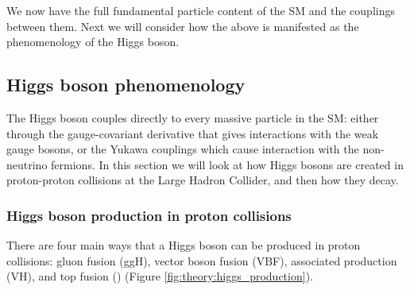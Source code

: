 We now have the full fundamental particle content of the SM and the couplings between them. Next we will consider how the above is manifested as the phenomenology of the Higgs boson.


\subsection{Higgs boson phenomenology}
The Higgs boson couples directly to every massive particle in the SM: either through the gauge-covariant derivative that gives interactions with the weak gauge bosons, or the Yukawa couplings which cause interaction with the non-neutrino fermions. In this section we will look at how Higgs bosons are created in proton-proton collisions at the Large Hadron Collider, and then how they decay.

\subsubsection{Higgs boson production in proton collisions}
There are four main ways that a Higgs boson can be produced in proton collisions: gluon fusion (ggH), vector boson fusion (VBF), associated production (VH), and top fusion (\ttH) (Figure \ref{fig:theory:higgs_production}). 

